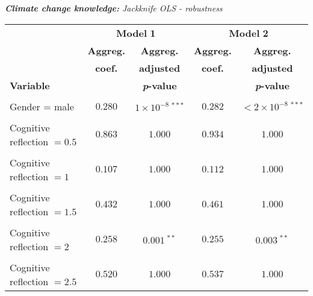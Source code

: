 \documentclass[a4paper,12pt]{article}
\begin{document}
{\centering
\begin{threeparttable}
\singlespacing
\caption{\vspace{-0.2cm}\textit{\textbf{Climate change knowledge:} Jackknife OLS - robustness}}
\label{ClimKnowInOut} 
\centering
\begin{small}
\vspace{-1.35cm}
\begin{tabular}{lcccc} 
\hline
  \multicolumn{1}{l}{}&\multicolumn{2}{c}{\textbf{Model} $\boldsymbol{1}$}&\multicolumn{2}{c}{\textbf{Model} $\boldsymbol{2}$}\\
\cmidrule(lr){2-3} \cmidrule(lr){4-5}
  \multicolumn{1}{l}{} & \multicolumn{1}{c}{\textbf{Aggreg.}}& \multicolumn{1}{c}{\textbf{Aggreg.}}& \multicolumn{1}{c}{\textbf{Aggreg.}} &  \multicolumn{1}{c}{\textbf{Aggreg.}} \\
    \multicolumn{1}{l}{} & \multicolumn{1}{c}{\textbf{coef.}}& \multicolumn{1}{c}{\textbf{adjusted}}& \multicolumn{1}{c}{\textbf{coef.}} &  \multicolumn{1}{c}{\textbf{adjusted}} \\
        \multicolumn{1}{l}{\textbf{Variable}}&\multicolumn{1}{c}{}& \multicolumn{1}{c}{\textbf{\textit{p}-value}}&\multicolumn{1}{c}{} &  \multicolumn{1}{c}{\textbf{\textit{p}-value}}\\
 \hline \vspace{-0.3cm}
\\
\vspace{-0.33cm}Gender = male&$0.280$&$1\times10^{-8}~^{***}$&$0.282$&$<2\times10^{-8}~^{***}$\\
  \\
\vspace{-0.33cm}Cognitive reflection $=0.5$&$0.863$&$1.000$&$0.934$&$1.000$\\
  \\
  \vspace{-0.33cm}Cognitive reflection $=1$&$0.107$&$1.000$ &$0.112$&$1.000$\\
    \\
  \vspace{-0.33cm}Cognitive reflection $=1.5$&$0.432$&$1.000$&$0.461$&$1.000$\\
\\
\vspace{-0.33cm}Cognitive reflection $=2$&$0.258$&$0.001~^{**}$&$0.255$&$0.003~^{**}$\\
  \\
  \vspace{-0.33cm}Cognitive reflection $=2.5$&$0.520$&$1.000$ &$0.537$&$1.000$\\

\end{tabular}
\end{small}
\end{threeparttable}}
\end{document}
